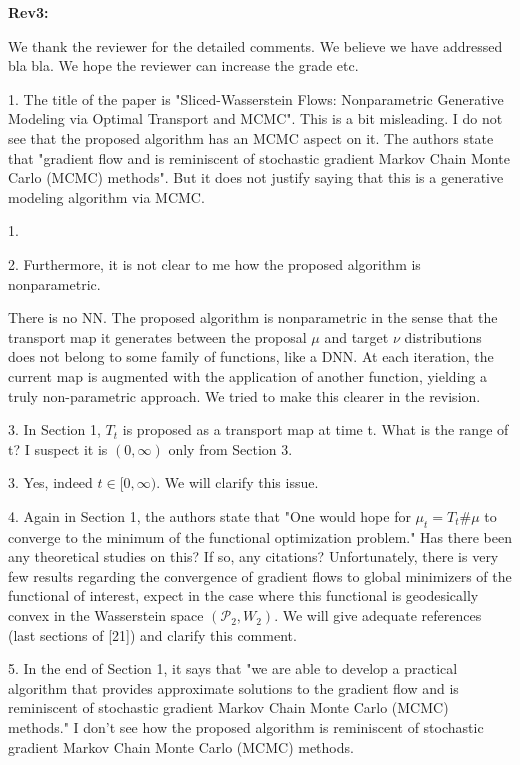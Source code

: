 \documentclass{article}
\newcommand{\rev}[1]{{\color{red} #1}}
\newcommand{\umut}[1]{{\color{blue} #1}}
\newcommand{\alain}[1]{{\color{cyan} #1}}
\newcommand{\antoine}[1]{{\color{orange} #1}}
\begin{document}
\textbf{Rev3:}


\umut{We thank the reviewer for the detailed comments. We believe we have addressed bla bla. We hope the reviewer can increase the grade etc. }

\rev{1. The title of the paper is "Sliced-Wasserstein Flows: Nonparametric Generative Modeling via Optimal Transport and MCMC". This is a bit misleading. I do not see that the proposed algorithm has an MCMC aspect on it. The authors state that "gradient flow and is reminiscent of stochastic gradient Markov Chain Monte Carlo (MCMC) methods". But it does not justify saying that this is a generative modeling algorithm via MCMC.}

1.

\rev{2. Furthermore, it is not clear to me how the proposed algorithm is nonparametric.}

\umut{There is no NN.}
\antoine{The proposed algorithm is nonparametric in the sense that the transport map it generates between the proposal $\mu$ and target $\nu$ distributions does not belong to some family of functions, like a DNN. At each iteration, the current map is augmented with the application of another function, yielding a truly non-parametric approach. We tried to make this clearer in the revision.}

\rev{3. In Section 1, $T_t$ is proposed as a transport map at time t. What is the range of t? I suspect it is $(0, \infty)$ only from Section 3.}

3. Yes, indeed $t \in [0, \infty)$. We will clarify this issue.

\rev{4. Again in Section 1, the authors state that "One would hope for $\mu_t = T_t \#\mu$ to converge to the minimum of the functional optimization problem." Has there been any theoretical studies on this? If so, any citations?}
\alain{Unfortunately, there is very few results regarding the  convergence of gradient flows to global minimizers of the functional of interest, expect in the case where this functional is geodesically convex in the Wasserstein space $(\mathcal{P}_2,W_2)$. We will give adequate references (last sections of [21]) and clarify this comment.}

\rev{5. In the end of Section 1, it says that "we are able to develop a practical algorithm that provides approximate solutions to the gradient flow and is reminiscent of stochastic gradient Markov Chain Monte Carlo (MCMC) methods." I don't see how the proposed algorithm is reminiscent of stochastic gradient Markov Chain Monte Carlo (MCMC) methods.}
\end{document}
